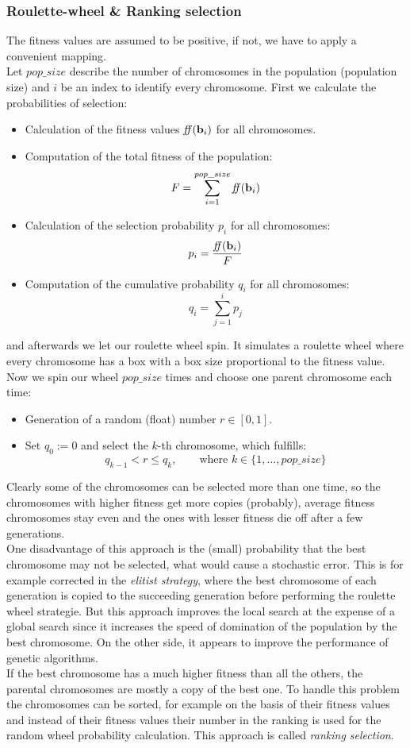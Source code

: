 \subsubsection{Roulette-wheel \& Ranking selection}
The fitness values are assumed to be positive, if not, we have to apply a convenient mapping.\\
Let $pop\_size$ describe the number of chromosomes in the population (population size) and $i$ be an index to identify every chromosome. First we calculate the probabilities of selection:
\begin{itemize}
\item Calculation of the fitness values $\mathit{ff}(\textbf{b}_i)$ for all chromosomes.
\item Computation of the total fitness of the population:
	\[ F = \sum_{i=1}^{pop\_size}\mathit{ff}(\textbf{b}_i) \]
\item Calculation of the selection probability $p_i$ for all chromosomes:
	\[ p_i = \frac{\mathit{ff}(\textbf{b}_i)}{F} \]
\item Computation of the cumulative probability $q_i$ for all chromosomes:
	\[ q_i = \sum_{j=1}^i p_j  \]
\end{itemize}
and afterwards we let our roulette wheel spin. It simulates a roulette wheel where every chromosome has a box with a box size proportional to the fitness value. Now we spin our wheel $pop\_size$ times and choose one parent chromosome each time:
\begin{itemize}
\item Generation of a random (float) number $r\in[0,1]$.
\item Set $q_0:=0$ and select the $k$-th chromosome, which fulfills:
	\[ q_{k-1} < r \leq q_k, \qquad \text{where } k\in\{1,\ldots,pop\_size\} \]
\end{itemize}
Clearly some of the chromosomes can be selected more than one time, so the chromosomes with higher fitness get more copies (probably), average fitness chromosomes stay even and the ones with lesser fitness die off after a few generations.\\
One disadvantage of this approach is the (small) probability that the best chromosome may not be selected, what would cause a stochastic error. This is for example corrected in the \emph{elitist strategy}, where the best chromosome of each generation is copied to the succeeding generation before performing the roulette wheel strategie. But this approach improves the local search at the expense of a global search since it increases the speed of domination of the population by the best chromosome. On the other side, it appears to improve the performance of genetic algorithms.\\
If the best chromosome has a much higher fitness than all the others, the parental chromosomes are mostly a copy of the best one. To handle this problem the chromosomes can be sorted, for example on the basis of their fitness values and instead of their fitness values their number in the ranking is used for the random wheel probability calculation. This approach is called \emph{ranking selection}.


